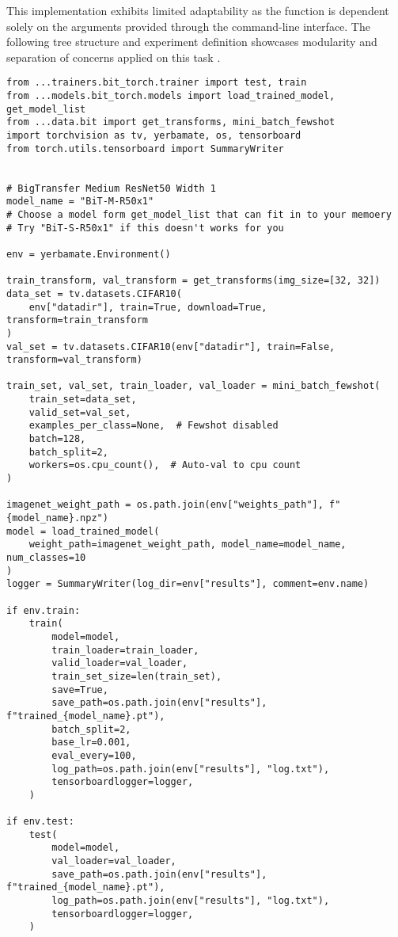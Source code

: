 This implementation exhibits limited adaptability as the function is dependent solely on the arguments provided through the command-line interface. The following tree structure and experiment definition showcases modularity and separation of concerns applied on this task .




\begin{verbatim}
from ...trainers.bit_torch.trainer import test, train
from ...models.bit_torch.models import load_trained_model, get_model_list
from ...data.bit import get_transforms, mini_batch_fewshot
import torchvision as tv, yerbamate, os, tensorboard
from torch.utils.tensorboard import SummaryWriter


# BigTransfer Medium ResNet50 Width 1
model_name = "BiT-M-R50x1"
# Choose a model form get_model_list that can fit in to your memoery
# Try "BiT-S-R50x1" if this doesn't works for you

env = yerbamate.Environment()

train_transform, val_transform = get_transforms(img_size=[32, 32])
data_set = tv.datasets.CIFAR10(
    env["datadir"], train=True, download=True, transform=train_transform
)
val_set = tv.datasets.CIFAR10(env["datadir"], train=False, transform=val_transform)

train_set, val_set, train_loader, val_loader = mini_batch_fewshot(
    train_set=data_set,
    valid_set=val_set,
    examples_per_class=None,  # Fewshot disabled
    batch=128,
    batch_split=2,
    workers=os.cpu_count(),  # Auto-val to cpu count
)

imagenet_weight_path = os.path.join(env["weights_path"], f"{model_name}.npz")
model = load_trained_model(
    weight_path=imagenet_weight_path, model_name=model_name, num_classes=10
)
logger = SummaryWriter(log_dir=env["results"], comment=env.name)

if env.train:
    train(
        model=model,
        train_loader=train_loader,
        valid_loader=val_loader,
        train_set_size=len(train_set),
        save=True,
        save_path=os.path.join(env["results"], f"trained_{model_name}.pt"),
        batch_split=2,
        base_lr=0.001,
        eval_every=100,
        log_path=os.path.join(env["results"], "log.txt"),
        tensorboardlogger=logger,
    )

if env.test:
    test(
        model=model,
        val_loader=val_loader,
        save_path=os.path.join(env["results"], f"trained_{model_name}.pt"),
        log_path=os.path.join(env["results"], "log.txt"),
        tensorboardlogger=logger,
    )

\end{verbatim}



